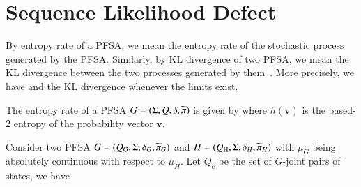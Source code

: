 \section{Sequence Likelihood Defect}
\label{sec:SLD}

\begin{defn}
By entropy rate of a PFSA, we mean the entropy rate of the stochastic process generated by the PFSA\cite{cover2012elements}. Similarly, by KL divergence of two PFSA, we mean the KL divergence between the two processes generated by them~\cite{matthews2016sparse}. More precisely, we have
and the KL divergence 
whenever the limits exist.
\end{defn}

\begin{thm}
\label{thm:Closed-formFormulaForEntropyRate}
The entropy rate of a PFSA $G = \left( \Sigma, Q, \delta, \widetilde{\pi} \right)$ is given by 
where $h(\mathbf{v})$ is the based-$2$ entropy of the probability vector $\mathbf{v}$.

Consider two PFSA $G = \left( Q_{\textrm{G}}, \Sigma, \delta_{G}, \widetilde{\pi}_{G} \right)$ and $H = \left( Q_{\textrm{H}}, \Sigma, \delta_{H}, \widetilde{\pi}_{H} \right)$ with $\mu_{G}$ being absolutely continuous with respect to $\mu_{H}$. Let $Q_\textrm{c}$ be the set of $G$-joint pairs of states, we have
\end{thm}

